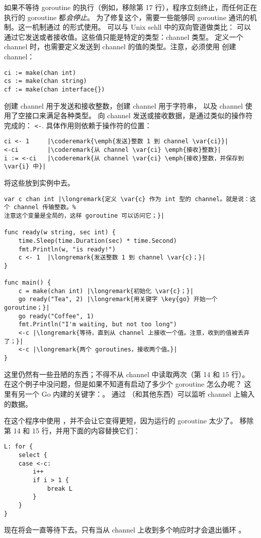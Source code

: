 如果不等待 goroutine 的执行（例如，移除第 17 行），程序立刻终止，而任何正在执行的 
goroutine 都\emph{会停止}。
为了修复这个，需要一些能够同 goroutine 通讯的机制。这一机制通过  
的形式使用。 可以与 Unix sehll 中的双向管道做类比：
可以通过它发送或者接收值。这些值只能是特定的类型：channel 类型。
定义一个 channel 时，也需要定义发送到 channel 的值的类型。注意，必须使用
 创建 channel：
\begin{lstlisting}
ci := make(chan int)
cs := make(chan string)
cf := make(chan interface{})
\end{lstlisting}
创建 channel  用于发送和接收整数，创建 channel  用于字符串，
以及 channel  使用了空接口来满足各种类型。
向 channel 发送或接收数据，是通过类似的操作符完成的：
\lstinline{<-}. 
具体作用则依赖于操作符的位置：
\begin{lstlisting}
ci <- 1	    |\coderemark{\emph{发送}整数 1 到 channel \var{ci}}|
<-ci	    |\coderemark{从 channel \var{ci} \emph{接收}整数}|
i := <-ci   |\coderemark{从 channel \var{ci} \emph{接收}整数，并保存到 \var{i} 中}|
\end{lstlisting}
将这些放到实例中去。
\begin{lstlisting}[numbers=none,caption=Go routines 和 channel,label=src:sleeping with channels]
var c chan int |\longremark{定义 \var{c} 作为 int 型的 channel。就是说：这个 channel 传输整数。%
注意这个变量是全局的，这样 goroutine 可以访问它；}|

func ready(w string, sec int) {
	time.Sleep(time.Duration(sec) * time.Second)
	fmt.Println(w, "is ready!")
	c <- 1	|\longremark{发送整数 1 到 channel \var{c}；}|
}

func main() {
	c = make(chan int) |\longremark{初始化 \var{c}；}|
	go ready("Tea", 2) |\longremark{用关键字 \key{go} 开始一个 goroutine；}|
	go ready("Coffee", 1)
	fmt.Println("I'm waiting, but not too long")
	<-c |\longremark{等待，直到从 channel 上接收一个值。注意，收到的值被丢弃了；}|
	<-c |\longremark{两个 goroutines，接收两个值。}|
}
\end{lstlisting}

\showremarks
这里仍然有一些丑陋的东西；不得不从 channel 中读取两次（第 14 和 15 行）。
在这个例子中没问题，但是如果不知道有启动了多少个 goroutine 怎么办呢？
这里有另一个 Go 内建的关键字：。
通过 （和其他东西）可以监听 channel 上输入的数据。

在这个程序中使用 ，并不会让它变得更短，因为运行的 go\-routine 太少了。
移除第 14 和 15 行，并用下面的内容替换它们：
\begin{lstlisting}[caption=使用 select,numbers=right,firstnumber=14]
L: for {
	select {
	case <-c:
		i++ 
		if i > 1 { 
			break L
		}   
	}   
}   
\end{lstlisting}
现在将会一直等待下去。只有当从 channel  上收到多个响应时才会退出循环 。


